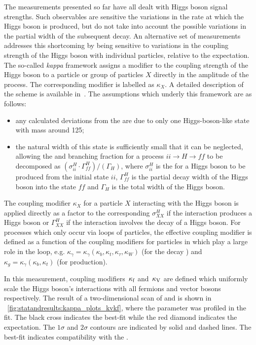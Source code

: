 The measurements presented so far have all dealt with Higgs boson signal strengths. Such observables are sensitive the variations in the rate at which the Higgs boson is produced, but do not take into account the possible variations in the partial width of the subsequent decay. An alternative set of measurements addresses this shortcoming by being sensitive to variations in the coupling strength of the Higgs boson with individual particles, relative to the \SM expectation. The so-called \emph{kappa} framework assigns a modifier to the coupling strength of the Higgs boson to a particle or group of particles $X$ directly in the amplitude of the process. The corresponding modifier is labelled as $\kappa_{X}$. A detailed description of the scheme is available in~\cite{Khachatryan:2016vau}.  
The assumptions which underly this framework are as follows: 
\begin{itemize}
\item any calculated deviations from the \SM are due to only one Higgs-boson-like state with mass around 125\GeV;
\item the natural width of this state is sufficiently small that it can be neglected, allowing the \crosssection and branching fraction for a process $ii\rightarrow H \rightarrow ff$ to be decomposed as $(\sigma_{ii}^{H} \cdot \Gamma_{ff}^{H}) / (\Gamma_H)$, where $\sigma_{ii}^{H}$ is the \crosssection for a Higgs boson to be produced from the initial state $ii$,  $\Gamma^{H}_{ff}$ is the partial decay width of the Higgs boson into the state $ff$ and $\Gamma_{H}$ is the total width of the Higgs boson.
\end{itemize}

The coupling modifier $\kappa_{X}$ for a particle $X$ interacting with the Higgs boson is applied directly as a factor to the corresponding $\sigma_{XX}^{H}$ if the interaction produces a Higgs boson or $\Gamma^{H}_{XX}$ if the interaction involves the decay of  a Higgs boson. For processes which only occur via loops of particles, the effective coupling modifier is defined as a function of the coupling modifiers for particles in which play a large role in the loop, e.g. $\kappa_{\gamma} = \kappa_{\gamma}(\kappa_b, \kappa_t,\kappa_\tau,\kappa_W) $ (for the decay \Hgg) and $\kappa_{g} = \kappa_{\gamma}(\kappa_b, \kappa_t) $ (for \ggH production). 

In this measurement, coupling modifiers $\,\kappa_\text{f}$ and $\,\kappa_\text{V}$ are defined which uniformly scale the Higgs boson's interactions with all fermions and vector bosons respectively. The result of a two-dimensional \DNLL scan of \kf and \kV is shown in \Fig~\ref{fig:statandresults:kappa_plots_kvkf}, where the \mH parameter was profiled in the fit. The black cross indicates the best-fit while the red diamond indicates the \SM expectation. The $1\sigma$ and $2\sigma$ contours are indicated by solid and dashed lines. The best-fit indicates compatibility with the \SM. 

